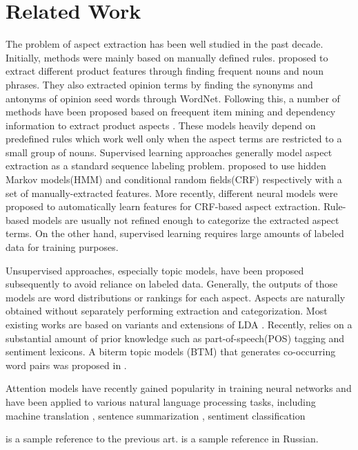 \documentclass{article}
\begin{document}
\section{Related Work}
\label{sec:related}
The problem of aspect extraction has been well studied in the past decade. Initially, methods were mainly based on manually defined rules. \cite{HuLiu2004} proposed to extract different product features through finding frequent nouns and noun phrases. They also extracted opinion terms by finding the synonyms and antonyms of opinion seed words through WordNet. Following this, a number of methods have been proposed based on freequent item mining and dependency information to extract product aspects \cite{Zhuang2006} \cite{Somasundarn2009} \cite{Qiu2011}. These models heavily depend on predefined rules which work well only when the aspect terms are restricted to a small group of nouns. Supervised learning approaches generally model aspect extraction as a standard sequence labeling problem. \cite{Jin2009} \cite{Li2010} proposed to use hidden Markov models(HMM) and conditional random fields(CRF) respectively with a set of manually-extracted features. More recently, different neural models \cite{Yin2016} \cite{Wang2016} were proposed to automatically learn features for CRF-based aspect extraction. Rule-based models are usually not refined enough to categorize the extracted aspect terms. On the other hand, supervised learning requires large amounts of labeled data for training purposes.

Unsupervised approaches, especially topic models, have been proposed subsequently to avoid reliance on labeled data. Generally, the outputs of those models are word distributions or rankings for each aspect. Aspects are naturally obtained without separately performing extraction and categorization. Most existing works \cite{Brody2010UAS} \cite{Zhao2010JMA} \cite{Mukherjee2012} \cite{Chen2014} are based on variants and extensions of LDA \cite{Blei2003}. Recently, \cite{Wang2015} relies on a substantial amount of prior knowledge such as part-of-speech(POS) tagging and sentiment lexicons. A biterm topic models (BTM) that generates co-occurring word pairs was proposed in \cite{Yan2013}.

Attention models \cite{Mnih2014} have recently gained popularity in training neural networks and have been applied to various natural language processing tasks, including machine translation \cite{Bahdanau2015NMT}, sentence summarization \cite{Rush2015}, sentiment classification

\cite{levenshtein1966binary} is a sample reference to the previous art. \cite{levenshtein1966dvoichnie} is a sample reference in Russian.
\end{document}
